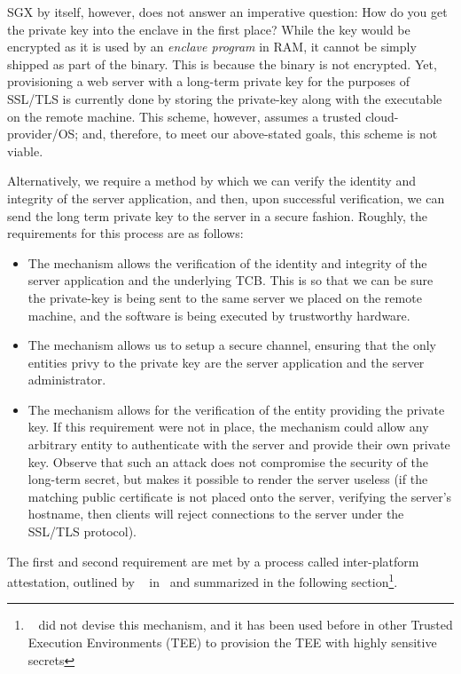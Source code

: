 \documentclass[../main.tex]{subfiles}
\begin{document}
SGX by itself, however, does not answer an imperative question: How do
you get the private key into the enclave in the first place? While the
key would be encrypted as it is used by an \textit{enclave program} in
RAM, it cannot be simply shipped as part of the binary. This is
because the binary is not encrypted. Yet, provisioning a web server
with a long-term private key for the purposes of SSL/TLS is currently
done by storing the private-key along with the executable on the
remote machine. This scheme, however, assumes a trusted
cloud-provider/OS; and, therefore, to meet our above-stated goals,
this scheme is not viable.

Alternatively, we require a method by which we can verify the identity
and integrity of the server application, and then, upon successful
verification, we can send the long term private key to the server in a
secure fashion. Roughly, the requirements for this process are as
follows:
\begin{itemize}
  \item The mechanism allows the verification of the identity and
    integrity of the server application and the underlying TCB.  This is
    so that we can be sure the private-key is being sent to the same
    server we placed on the remote machine, and the software is being
    executed by trustworthy hardware.
  \item The mechanism allows us to setup a secure channel, ensuring that
    the only entities privy to the private key are the server
    application and the server administrator.
  \item The mechanism allows for the verification of the entity
    providing the private key. If this requirement were not in place,
    the mechanism could allow any arbitrary entity to authenticate with
    the server and provide their own private key. Observe that such an
    attack does not compromise the security of the long-term secret, but
    makes it possible to render the server useless (if the matching
    public certificate is not placed onto the server, verifying the
    server's hostname, then clients will reject connections to the
    server under the SSL/TLS protocol). %
\end{itemize}
The first and second requirement are met by a process called
inter-platform attestation, outlined by \Intel~
in~\cite{IntelCorporation2010} and summarized in the following
section\footnote{\Intel~ did not devise this mechanism, and it has been
used before in other Trusted Execution Environments (TEE) to
provision the TEE with highly sensitive secrets}.
\end{document}
